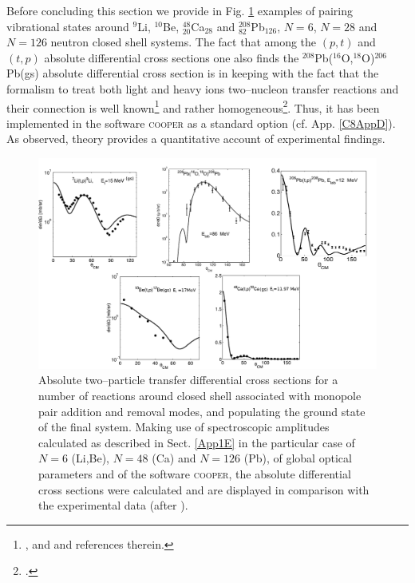  Before concluding this section we provide in Fig. \ref{fig8_2_1} examples of pairing vibrational states around $^9$Li, $^{10}$Be, $^{48}_{20}$Ca$_{28}$ and $^{208}_{82}$Pb$_{126}$, $N=6$,  $N=28$ and $N=126$ neutron closed shell systems. The fact that among the $(p,t)$ and $(t,p)$ absolute differential cross sections one also finds the $^{208}$Pb($^{16}$O,$^{18}$O)$^{206}$Pb(gs) absolute differential cross section is in keeping with the fact that the formalism to treat both light and heavy ions two--nucleon transfer reactions and their connection is well known\footnote{\cite{Broglia:04a}, \cite{Bayman:82} and  \cite{Thompson:88} and references therein.} and rather homogeneous\footnote{\cite{Potel:13b}.}. Thus, it has been implemented in the software \textsc{cooper} as a standard option (cf. App. \ref{C8AppD}). As observed, theory provides a quantitative account of experimental findings.
   \begin{figure}
   \centerline{\includegraphics*[width=12cm,angle=0]{C8/figsC8/fig8_1_5}}
   	\caption{Absolute two--particle transfer differential cross sections for a number of reactions around closed shell associated with monopole pair addition and removal modes, and populating the ground state of the final system. Making use of spectroscopic amplitudes calculated as described in Sect. \ref{App1E} in the particular case of $N=6$ (Li,Be), $N=48$ (Ca) and  $N=126$ (Pb), of global optical parameters and of the software \textsc{cooper}, the absolute differential cross sections were calculated and are displayed in comparison with the experimental data (after \cite{Potel:13}).}\label{fig8_2_1}
   \end{figure}
 
 
 
 
 
 
 
 
